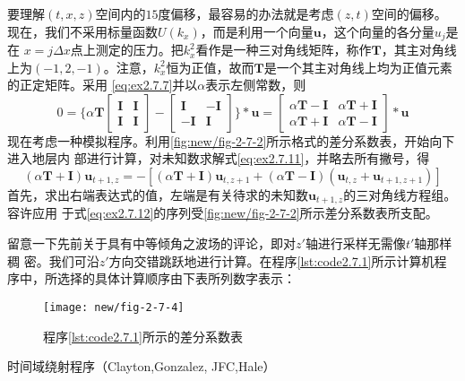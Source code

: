 要理解$(t,x,z)$空间内的$15$度偏移，最容易的办法就是考虑$(z,t)$空间的偏移。
现在，我们不采用标量函数$U(k_x)$，而是利用一个向量$\mathbf{u}$，这个向量的各分量$u_j$是在
$x=j\Delta x$点上测定的压力。把$k_x^2$看作是一种三对角线矩阵，称作$\mathbf{T}$，其主对角线上为$(-1,
2,-1)$。注意，$k_x^2$恒为正值，故而$\mathbf{T}$是一个其主对角线上均为正值元素的正定矩阵。采用
\ref{eq:ex2.7.7}并以$\alpha$表示左侧常数，则
\begin{equation}
0 = \{
\alpha\mathbf{T}
\begin{bmatrix}
\mathbf{I}&\mathbf{I}\\
\mathbf{I}&\mathbf{I}
\end{bmatrix}
-
\begin{bmatrix}
\mathbf{I}&-\mathbf{I}\\
-\mathbf{I}&\mathbf{I}
\end{bmatrix}
\}*\mathbf{u}
=
\begin{bmatrix}
\alpha\mathbf{T}-\mathbf{I}&\alpha\mathbf{T}+\mathbf{I}\\
\alpha\mathbf{T}+\mathbf{I}&\alpha\mathbf{T}-\mathbf{I}
\end{bmatrix}*\mathbf{u}
\label{eq:ex2.7.11}
\end{equation}
现在考虑一种模拟程序。利用\ref{fig:new/fig-2-7-2}所示格式的差分系数表，开始向下进入地层内
部进行计算，对未知数求解式\ref{eq:ex2.7.11}，并略去所有撇号，得
\begin{equation}
(\alpha\mathbf{T}+\mathbf{I})
\mathbf{u}_{t+1,z}=
-[
(\alpha\mathbf{T}+\mathbf{I})
\mathbf{u}_{t,z+1}+
(\alpha\mathbf{T}-\mathbf{I})
(\mathbf{u}_{t,z}+\mathbf{u}_{t+1,z+1})
]
\label{eq:ex2.7.12}
\end{equation}
首先，求出右端表达式的值，左端是有关待求的未知数$\mathbf{u}_{t+1,z}$的三对角线方程组。容许应用
于式\ref{eq:ex2.7.12}的序列受\ref{fig:new/fig-2-7-2}所示差分系数表所支配。

留意一下先前关于具有中等倾角之波场的评论，即对$z'$轴进行采样无需像$t'$轴那样稠
密。我们可沿$z'$方向交错跳跃地进行计算。在程序\ref{lst:code2.7.1}所示计算机程序中，所选择的具体计算顺序由下表所列数字表示：
\begin{figure}[H]
\centering
\texttt{[image: new/fig-2-7-4]}
\caption{程序\ref{lst:code2.7.1}所示的差分系数表}
\label{fig:new/fig-2-7-4}
\end{figure}
\begin{listing}[H]
    \caption{时间域绕射程序（Clayton,Gonzalez,
JFC,Hale）}
    \inputminted{Fortran}{code2-7-1.f90}
    \label{lst:code2.7.1}
    \end{listing}
